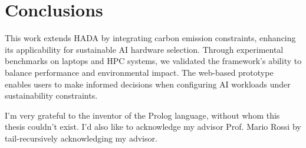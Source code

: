 \documentclass[a4paper,singleside,12pt]{report} %
\begin{document}
\chapter{Conclusions}

This work extends HADA by integrating carbon emission constraints, enhancing its applicability 
for sustainable AI hardware selection. Through experimental benchmarks on laptops and HPC systems, 
we validated the framework’s ability to balance performance and environmental impact. The web-based prototype 
enables users to make informed decisions when configuring AI workloads under sustainability constraints.

\appendix

\printbibliography[heading=bibintoc] %

\acknowledgements
I'm very grateful to the inventor of the Prolog language, without whom this thesis couldn't exist. I'd also like 
to acknowledge my advisor Prof. Mario Rossi by tail-recursively acknowledging my advisor.
	
\end{document}
